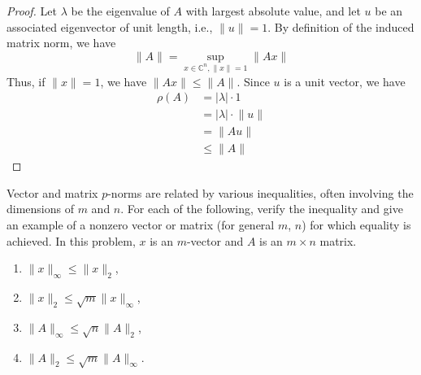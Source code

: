 \documentclass[12pt]{article}
\newenvironment{ex}[2][Exercise]{\begin{trivlist}
		\item[\hskip \labelsep {\bfseries #1}\hskip \labelsep {\bfseries #2.}]}{\end{trivlist}}
\begin{document}
\begin{proof}
	Let $\lambda$ be the eigenvalue of $A$ with largest absolute value, and let $u$ be an
	associated eigenvector of unit length, i.e., $\lVert u\rVert=1$. By definition of
	the induced matrix norm, we have
	\[
	\lVert A\rVert = \sup_{x\in \mathbb{C}^n, \lVert x\rVert=1}\lVert Ax\rVert
	\]
	Thus, if $\lVert x\rVert = 1$, we have $\lVert Ax\rVert \leq \lVert A\rVert$. Since
	$u$ is a unit vector, we have
	\begin{align*}
		\rho(A) &= |\lambda|\cdot 1\\
		&=|\lambda|\cdot \lVert u\rVert\\
		&=\lVert Au\rVert\\
		&\leq \lVert A\rVert
	\end{align*}
\end{proof}

\begin{ex}{3.3}
	Vector and matrix $p$-norms are related by various inequalities, often involving the dimensions
	of $m$ and $n$. For each of the following, verify the inequality and give an example of a nonzero
	vector or matrix (for general $m$, $n$) for which equality is achieved. In this problem, $x$ is
	an $m$-vector and $A$ is an $m\times n$ matrix.
	
	\begin{enumerate}[label=(\alph*)]
		\item $\lVert x\rVert_{\infty}\leq \lVert x\rVert_2$,
		\item $\lVert x\rVert_2 \leq \sqrt{m}\lVert x\rVert_{\infty}$,
		\item $\lVert A\rVert_{\infty}\leq \sqrt{n}\lVert A\rVert_2$,
		\item $\lVert A\rVert_2 \leq \sqrt{m}\lVert A\rVert_\infty$.
	\end{enumerate}
\end{ex}
\end{document}
